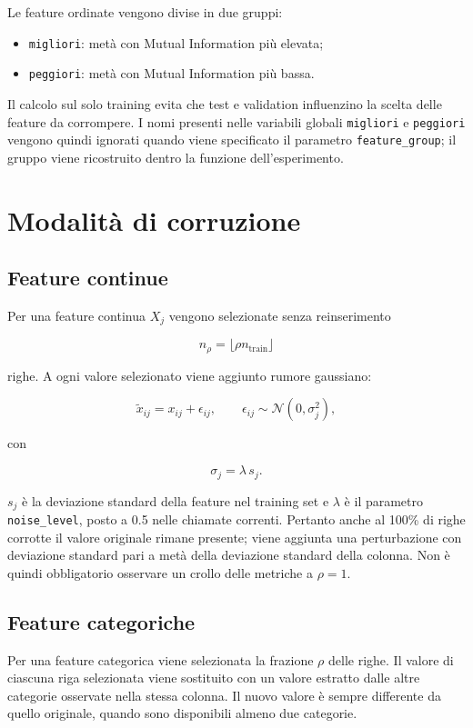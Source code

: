 \documentclass[11pt,a4paper]{article}
\begin{document}
Le feature ordinate vengono divise in due gruppi:

\begin{itemize}[noitemsep]
    \item \texttt{migliori}: metà con Mutual Information più elevata;
    \item \texttt{peggiori}: metà con Mutual Information più bassa.
\end{itemize}

Il calcolo sul solo training evita che test e validation influenzino la scelta delle feature da corrompere. I nomi presenti nelle variabili globali \texttt{migliori} e \texttt{peggiori} vengono quindi ignorati quando viene specificato il parametro \texttt{feature\_group}; il gruppo viene ricostruito dentro la funzione dell'esperimento.

\section{Modalità di corruzione}

\subsection{Feature continue}

Per una feature continua $X_j$ vengono selezionate senza reinserimento

\[
n_{\rho}=\lfloor \rho n_{\text{train}}\rfloor
\]

righe. A ogni valore selezionato viene aggiunto rumore gaussiano:

\[
\widetilde{x}_{ij}=x_{ij}+\epsilon_{ij},
\qquad
\epsilon_{ij}\sim\mathcal{N}(0,\sigma_j^2),
\]

con

\[
\sigma_j=\lambda\,s_j.
\]

$s_j$ è la deviazione standard della feature nel training set e $\lambda$ è il parametro \texttt{noise\_level}, posto a 0.5 nelle chiamate correnti. Pertanto anche al 100\% di righe corrotte il valore originale rimane presente; viene aggiunta una perturbazione con deviazione standard pari a metà della deviazione standard della colonna. Non è quindi obbligatorio osservare un crollo delle metriche a $\rho=1$.

\subsection{Feature categoriche}

Per una feature categorica viene selezionata la frazione $\rho$ delle righe. Il valore di ciascuna riga selezionata viene sostituito con un valore estratto dalle altre categorie osservate nella stessa colonna. Il nuovo valore è sempre differente da quello originale, quando sono disponibili almeno due categorie.
\end{document}
